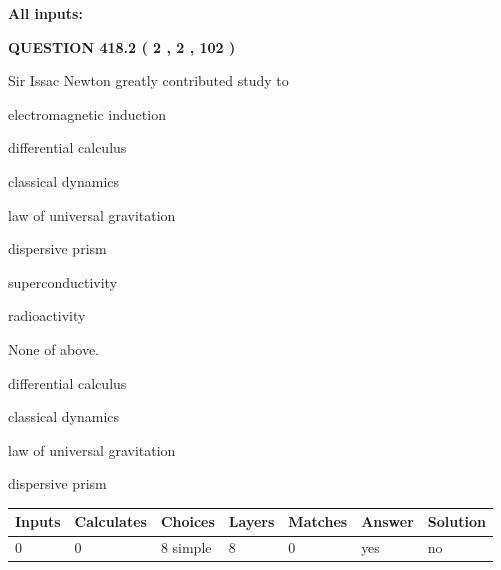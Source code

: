 \documentclass[12pt]{article}
\begin{document}
   
\noindent\vspace{0.1in}\hspace{-0.08in} {\textbf{\Large{All inputs: }}}
   
   
  
\vspace{0.2in}
  
{\textbf{\Large{QUESTION
418.2 
 ( 2 , 2 , 102 )
}}}
  
  
Sir Issac Newton greatly contributed study to
 
 
electromagnetic induction
 
 
differential calculus
 
 
classical dynamics
 
 
law of universal gravitation
 
 
dispersive prism
 
 
superconductivity
 
 
radioactivity
 
 
 None of above.
 
 
\noindent{}
 
 
differential calculus
 
 
classical dynamics
 
 
law of universal gravitation
 
 
dispersive prism
 
 
\noindent{}
 
 
   
   
   
   
\noindent\begin{tabular}{|l|l|l|l|l|l|l|}
 \hline
Inputs & Calculates & Choices & Layers & Matches & Answer & Solution \\ \hline
 0  & 
 0  & 
 8
  simple  
  & 
 8  & 
 0  & 
  yes & 
  no 
  \\ \hline
 \end{tabular}
   
   
   
   
\noindent{}
   
\end{document}
